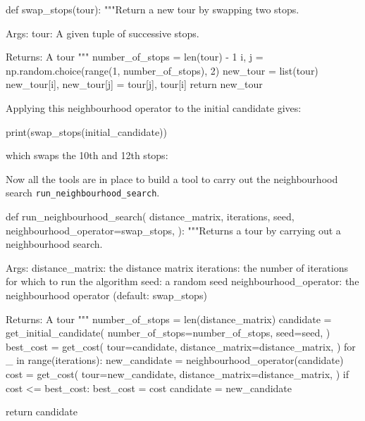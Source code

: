 \begin{pyin}
def swap_stops(tour):
    """Return a new tour by swapping two stops.

    Args:
        tour: A given tuple of successive stops.

    Returns:
        A tour
    """
    number_of_stops = len(tour) - 1
    i, j = np.random.choice(range(1, number_of_stops), 2)
    new_tour = list(tour)
    new_tour[i], new_tour[j] = tour[j], tour[i]
    return new_tour
\end{pyin}

Applying this neighbourhood operator to the initial candidate gives:

\begin{pyin}
print(swap_stops(initial_candidate))
\end{pyin}

which swaps the 10th and 12th stops:

\begin{pyout}
[0, 7, 12, 5, 11, 3, 9, 2, 8, 1, 4, 10, 6, 0]
\end{pyout}

Now all the tools are in place to build a tool to carry out the
neighbourhood search \texttt{run_neighbourhood_search}.

\begin{pyin}
def run_neighbourhood_search(
    distance_matrix,
    iterations,
    seed,
    neighbourhood_operator=swap_stops,
):
    """Returns a tour by carrying out a neighbourhood search.

    Args:
        distance_matrix: the distance matrix
        iterations: the number of iterations for which to
                    run the algorithm
        seed: a random seed
        neighbourhood_operator: the neighbourhood operator
                                (default: swap_stops)

    Returns:
        A tour
    """
    number_of_stops = len(distance_matrix)
    candidate = get_initial_candidate(
        number_of_stops=number_of_stops,
        seed=seed,
    )
    best_cost = get_cost(
        tour=candidate,
        distance_matrix=distance_matrix,
    )
    for _ in range(iterations):
        new_candidate = neighbourhood_operator(candidate)
        cost = get_cost(
            tour=new_candidate,
            distance_matrix=distance_matrix,
        )
        if cost <= best_cost:
            best_cost = cost
            candidate = new_candidate

    return candidate
\end{pyin}

